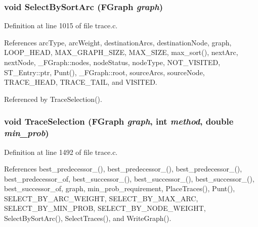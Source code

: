 \subsubsection{\setlength{\rightskip}{0pt plus 5cm}void Select\-By\-Sort\-Arc (\bf{FGraph} {\em graph})}\label{trace_8h_f69473c3584deec2bb73993e0842584d}




Definition at line 1015 of file trace.c.

References arc\-Type, arc\-Weight, destination\-Arcs, destination\-Node, graph, LOOP\_\-HEAD, MAX\_\-GRAPH\_\-SIZE, MAX\_\-SIZE, max\_\-sort(), next\-Arc, next\-Node, \_\-FGraph::nodes, node\-Status, node\-Type, NOT\_\-VISITED, ST\_\-Entry::ptr, Punt(), \_\-FGraph::root, source\-Arcs, source\-Node, TRACE\_\-HEAD, TRACE\_\-TAIL, and VISITED.

Referenced by Trace\-Selection().
\subsubsection{\setlength{\rightskip}{0pt plus 5cm}void Trace\-Selection (\bf{FGraph} {\em graph}, int {\em method}, double {\em min\_\-prob})}\label{trace_8h_951defdcd9a7214e202ca16f3eb98b94}




Definition at line 1492 of file trace.c.

References best\_\-predecessor\_(), best\_\-predecessor\_(), best\_\-predecessor\_(), best\_\-predecessor\_\-of, best\_\-successor\_(), best\_\-successor\_(), best\_\-successor\_(), best\_\-successor\_\-of, graph, min\_\-prob\_\-requirement, Place\-Traces(), Punt(), SELECT\_\-BY\_\-ARC\_\-WEIGHT, SELECT\_\-BY\_\-MAX\_\-ARC, SELECT\_\-BY\_\-MIN\_\-PROB, SELECT\_\-BY\_\-NODE\_\-WEIGHT, Select\-By\-Sort\-Arc(), Select\-Traces(), and Write\-Graph().
